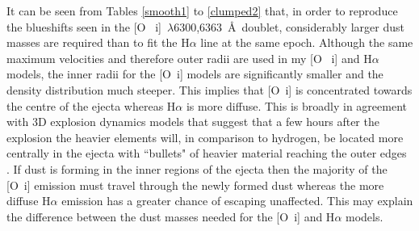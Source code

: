 It can be seen from Tables \ref{smooth1} to \ref{clumped2} that, in order 
to reproduce the blueshifts seen in the [O~{\sc 
i}]~$\lambda$6300,6363~\AA\ doublet, considerably larger dust masses are 
required than to fit the H$\alpha$ line at the same epoch.  Although the 
same maximum velocities and therefore outer radii are used in my [O~{\sc 
i}] and H$\alpha$ models, the inner radii for the [O~{\sc i}] models are 
significantly smaller and the density distribution much steeper.  This 
implies that [O~{\sc i}] is concentrated towards the centre of the 
ejecta whereas H$\alpha$ is more diffuse.  This is broadly in 
agreement with 3D explosion dynamics models that suggest that a few hours 
after the explosion the heavier elements will, in comparison to hydrogen, 
be located more centrally in the ejecta with ``bullets" of heavier 
material reaching the outer edges \citep{Hammer2010}.  If dust is forming 
in the inner regions of the ejecta then the majority of the [O~{\sc i}] 
emission must travel through the newly formed dust whereas the more 
diffuse H$\alpha$ emission has a greater chance of escaping unaffected.  
This may explain the difference between the dust masses needed for the 
[O~{\sc i}] and H$\alpha$ models.


